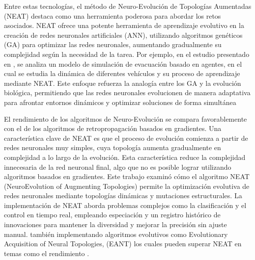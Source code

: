 \documentclass[conference]{IEEEtran}
\begin{document}

Entre estas tecnologías, el método de Neuro-Evolución de Topologías Aumentadas (NEAT) destaca como una herramienta poderosa para abordar los retos asociados. NEAT ofrece una potente herramienta de aprendizaje evolutivo en la creación de redes neuronales artificiales (ANN), utilizando algoritmos genéticos (GA) para optimizar las redes neuronales, aumentando gradualmente su complejidad según la necesidad de la tarea. Por ejemplo, en el estudio presentado en \cite{NEAT}, se analiza un modelo de simulación de evacuación basado en agentes, en el cual se estudia la dinámica de diferentes vehículos y su proceso de aprendizaje mediante NEAT. Este enfoque refuerza la analogía entre los GA y la evolución biológica, permitiendo que las redes neuronales evolucionen de manera adaptativa para afrontar entornos dinámicos y optimizar soluciones de forma simultánea

El rendimiento de los algoritmos de Neuro-Evolución se compara favorablemente con el de los algoritmos de retropropagación basados en gradientes. Una característica clave de NEAT es que el proceso de evolución comienza a partir de redes neuronales muy simples, cuya topología aumenta gradualmente en complejidad a lo largo de la evolución\cite{NEAT_2}. Esta característica reduce la complejidad innecesaria de la red neuronal final, algo que no es posible lograr utilizando algoritmos basados en gradientes.
Este trabajo examinó cómo el algoritmo NEAT (NeuroEvolution of Augmenting Topologies) permite la optimización evolutiva de redes neuronales mediante topologías dinámicas y mutaciones estructurales. La implementación de NEAT aborda problemas complejos como la clasificación y el control en tiempo real, empleando especiación y un registro histórico de innovaciones para mantener la diversidad y mejorar la precisión sin ajuste manual. también implementando  algoritmos evolutivos como Evolutionary Acquisition of Neural Topologies, (EANT) los cuales pueden superar NEAT en temas  como el rendimiento \cite{NAT_R}.
\end{document}
